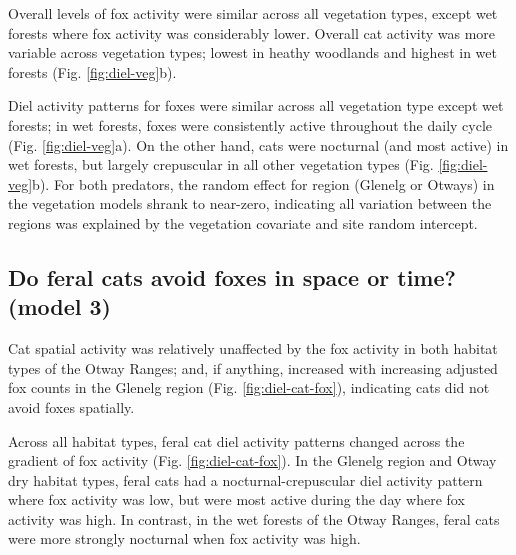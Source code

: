 \documentclass[11pt,a4paper,titlepage,twoside,openright]{style/unimelbthesis}
\begin{document}
\begin{mainmatter}
Overall levels of fox activity were similar across all vegetation types, except wet forests where fox activity was considerably lower. Overall cat activity was more variable across vegetation types; lowest in heathy woodlands and highest in wet forests (Fig. \ref{fig:diel-veg}b).

Diel activity patterns for foxes were similar across all vegetation type except wet forests; in wet forests, foxes were consistently active throughout the daily cycle (Fig. \ref{fig:diel-veg}a). On the other hand, cats were nocturnal (and most active) in wet forests, but largely crepuscular in all other vegetation types (Fig. \ref{fig:diel-veg}b). For both predators, the random effect for region (Glenelg or Otways) in the vegetation models shrank to near-zero, indicating all variation between the regions was explained by the vegetation covariate and site random intercept.

\hypertarget{do-feral-cats-avoid-foxes-in-space-or-time-model-3-1}{%
\subsection{Do feral cats avoid foxes in space or time? (model 3)}\label{do-feral-cats-avoid-foxes-in-space-or-time-model-3-1}}

Cat spatial activity was relatively unaffected by the fox activity in both habitat types of the Otway Ranges; and, if anything, increased with increasing adjusted fox counts in the Glenelg region (Fig. \ref{fig:diel-cat-fox}), indicating cats did not avoid foxes spatially.

Across all habitat types, feral cat diel activity patterns changed across the gradient of fox activity (Fig. \ref{fig:diel-cat-fox}). In the Glenelg region and Otway dry habitat types, feral cats had a nocturnal-crepuscular diel activity pattern where fox activity was low, but were most active during the day where fox activity was high. In contrast, in the wet forests of the Otway Ranges, feral cats were more strongly nocturnal when fox activity was high.

\newpage
\begin{figure}


\end{figure}
\end{mainmatter}
\end{document}
